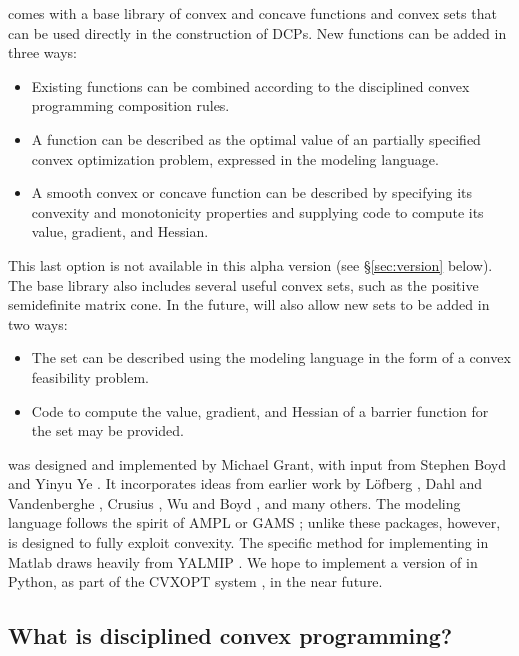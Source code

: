 \documentclass[12pt]{article}
\begin{document}
\cvx comes with a base library of convex
and concave functions and convex sets that can be used
directly in the construction of DCPs. New functions can
be added in three ways:
\begin{itemize}
\item Existing functions 
can be combined according to the disciplined convex programming 
composition rules.
\item A function can be described as the optimal value 
of an partially specified convex optimization problem, expressed
in the \cvx modeling language.
\item A smooth convex or concave function can be described by
specifying its convexity and monotonicity properties and supplying
code to compute its value, gradient, and Hessian.
\end{itemize}
This last option is not available in this alpha version (see \S\ref{sec:version} below).
The base library also includes several useful convex sets, such as the
positive semidefinite matrix cone. In the future, \cvx will also allow
new sets to be added in two ways:
\begin{itemize}
\item The set can be described using the \cvx modeling language in the
form of a convex feasibility problem.
\item Code to compute the value, gradient, and Hessian
of a barrier function for the set may be provided.
\end{itemize}

\cvx was designed and implemented by Michael Grant, with input
from Stephen Boyd and Yinyu Ye \cite{GBY}. It
incorporates ideas from earlier work by 
L\"{o}fberg \cite{YALMIP}, 
Dahl and Vandenberghe \cite{CVXOPT}, 
Crusius \cite{Cru:02}, 
Wu and Boyd \cite{SDPSOL},
and many others.
The modeling language follows
the spirit of AMPL \cite{AMPL} or GAMS \cite{GAMS}; unlike
these packages, however, \cvx is designed to fully exploit convexity.
The specific method for implementing \cvx in Matlab
draws heavily from YALMIP \cite{YALMIP}.
We hope to implement a version of \cvx in Python,
as part of the CVXOPT system \cite{CVXOPT}, in the near future.

\subsection{What is disciplined convex programming?}
\end{document}
